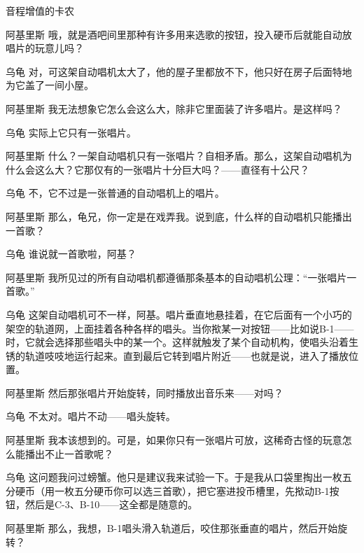 \begin{dialog}{音程增值的卡农}
\begin{dialogue}
\item[阿基里斯]哦，就是酒吧间里那种有许多用来选歌的按钮，投入硬币后就能自动放唱片的玩意儿吗？

\item[乌龟]对，可这架自动唱机太大了，他的屋子里都放不下，他只好在房子后面特地为它盖了一间小屋。

\item[阿基里斯]我无法想象它怎么会这么大，除非它里面装了许多唱片。是这样吗？

\item[乌龟]实际上它只有一张唱片。

\item[阿基里斯]什么？一架自动唱机只有一张唱片？自相矛盾。那么，这架自动唱机为什么会这么大？它那仅有的一张唱片十分巨大吗？——直径有十公尺？

\item[乌龟]不，它不过是一张普通的自动唱机上的唱片。

\item[阿基里斯]那么，龟兄，你一定是在戏弄我。说到底，什么样的自动唱机只能播出一首歌？

\item[乌龟]谁说就一首歌啦，阿基？

\item[阿基里斯]我所见过的所有自动唱机都遵循那条基本的自动唱机公理：“一张唱片一首歌。”

\item[乌龟]这架自动唱机可不一样，阿基。唱片垂直地悬挂着，在它后面有一个小巧的架空的轨道网，上面挂着各种各样的唱头。当你揿某一对按钮——比如说B-1——时，它就会选择那些唱头中的某一个。这样就触发了某个自动机构，使唱头沿着生锈的轨道吱吱地运行起来。直到最后它转到唱片附近——也就是说，进入了播放位置。

\item[阿基里斯]然后那张唱片开始旋转，同时播放出音乐来——对吗？

\item[乌龟]不太对。唱片不动——唱头旋转。

\item[阿基里斯]我本该想到的。可是，如果你只有一张唱片可放，这稀奇古怪的玩意怎么能播出不止一首歌呢？

\item[乌龟]这问题我问过螃蟹。他只是建议我来试验一下。于是我从口袋里掏出一枚五分硬币（用一枚五分硬币你可以选三首歌），把它塞进投币槽里，先揿动B-1按钮，然后是C-3、B-10——这全都是随意的。

\item[阿基里斯]那么，我想，B-1唱头滑入轨道后，咬住那张垂直的唱片，然后开始旋转？


\end{dialogue}
\end{dialog}
